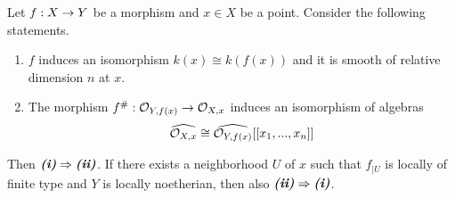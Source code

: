 \begin{theorem}\label{theorem:formal_criterion_for_smoothness}
Let $f:X\rightarrow Y$ be a morphism and $x\in X$ be a point. Consider the following statements.
\begin{enumerate}[label=\emph{\textbf{(\roman*)}}, leftmargin=3.0em]
\item $f$ induces an isomorphism $k(x)\cong k(f(x))$ and it is smooth of relative dimension $n$ at $x$.
\item The morphism $f^{\#}:{\mathcal O}_{Y,f(x)}\rightarrow {\mathcal O}_{X,x}$ induces an isomorphism of algebras
$$\widehat{{\mathcal O}_{X,x}}\cong \widehat{{\mathcal O}_{Y,f(x)}}[[x_1,...,x_n]]$$
\end{enumerate}
Then $\textbf{\emph{(i)}}\Rightarrow \textbf{\emph{(ii)}}$. If there exists a neighborhood $U$ of $x$ such that $f_{\mid U}$ is locally of finite type and $Y$ is locally noetherian, then also $\textbf{\emph{(ii)}}\Rightarrow \textbf{\emph{(i)}}$.
\end{theorem}
